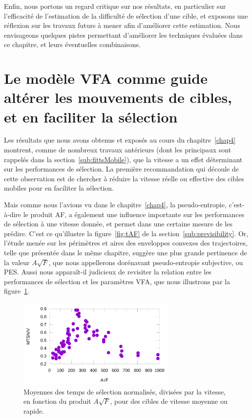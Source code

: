 	Enfin, nous portons un regard critique sur nos résultats, en particulier sur l'efficacité de l'estimation de la difficulté de sélection d'une cible, et exposons une réflexion sur les travaux futurs à mener afin d'améliorer cette estimation. Nous envisageons quelques pistes permettant d'améliorer les techniques évaluées dans ce chapitre, et leurs éventuelles combinaisons.
	
\section[VFA : guide pour altérer les mouvements de cibles]{Le modèle VFA comme guide altérer les mouvements de cibles, et en faciliter la sélection}
	\label{sub:vfaGuide}
	Les résultats que nous avons obtenus et exposés au cours du chapitre~\ref{chap4} montrent, comme de nombreux travaux antérieurs (dont les principaux sont rappelés dans la section~\ref{sub:fittsMobile}), que la vitesse a un effet déterminant sur les performances de sélection. La première recommandation qui découle de cette observation est de chercher à réduire la vitesse réelle ou effective des cibles mobiles pour en faciliter la sélection.

	Mais comme nous l'avions vu dans le chapitre~\ref{chap4}, la pseudo-entropie, c'est-à-dire le produit AF, a également une influence importante sur les performances de sélection à une vitesse donnée, et permet dans une certaine mesure de les prédire. C'est ce qu'illustre la figure~\ref{fig:tAF} de la section~\ref{sub:previsibility}. Or, l'étude menée sur les périmètres et aires des enveloppes convexes des trajectoires, telle que présentée dans le même chapitre, suggère une plus grande pertinence de la valeur $A\sqrt{F}$, que nous appellerons dorénavant pseudo-entropie subjective, ou PES. Aussi nous apparaît-il judicieux de revisiter la relation entre les performances de sélection et les paramètres VFA, que nous illustrons par la figure~\ref{fig:tAsqrtF}.
	
	\begin{figure}[!htb]
		\centering
		\includegraphics[width=0.7\textwidth]{figures/ch5/asqrtFvTime}
		\caption[MTSN/V en fonction de $A\sqrt{F}$]{Moyennes des temps de sélection normalisés, divisées par la vitesse, en fonction du produit $A\sqrt{F}$, pour des cibles de vitesse moyenne ou rapide.}
		\label{fig:tAsqrtF}
	\end{figure}
	
